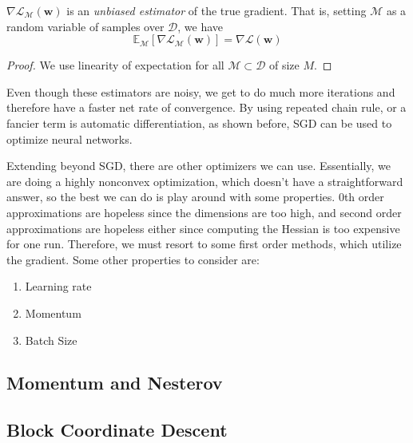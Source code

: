   \begin{theorem}
    $\nabla \mathcal{L}_{\mathcal{M}} (\mathbf{w})$ is an \textit{unbiased estimator} of the true gradient. That is, setting $\mathcal{M}$ as a random variable of samples over $\mathcal{D}$, we have 
    \begin{equation}
      \mathbb{E}_{\mathcal{M}} [\nabla \mathcal{L}_{\mathcal{M}} (\mathbf{w})] = \nabla \mathcal{L} (\mathbf{w})
    \end{equation}
  \end{theorem}
  \begin{proof}
    We use linearity of expectation for all $\mathcal{M} \subset \mathcal{D}$ of size $M$. 
  \end{proof}

  Even though these estimators are noisy, we get to do much more iterations and therefore have a faster net rate of convergence. By using repeated chain rule, or a fancier term is automatic differentiation, as shown before, SGD can be used to optimize neural networks. 

  Extending beyond SGD, there are other optimizers we can use. Essentially, we are doing a highly nonconvex optimization, which doesn't have a straightforward answer, so the best we can do is play around with some properties. 0th order approximations are hopeless since the dimensions are too high, and second order approximations are hopeless either since computing the Hessian is too expensive for one run. Therefore, we must resort to some first order methods, which utilize the gradient. Some other properties to consider are: 
  \begin{enumerate} 
    \item Learning rate 
    \item Momentum 
    \item Batch Size
  \end{enumerate}

\subsection{Momentum and Nesterov}

\subsection{Block Coordinate Descent} 

